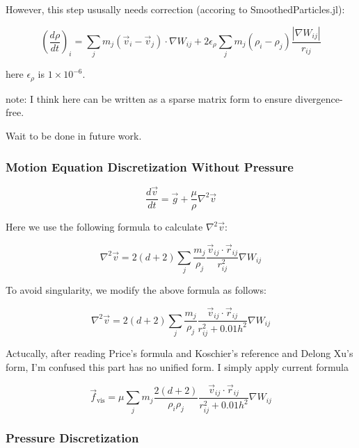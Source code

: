 \documentclass[10pt, oneside]{article}
\begin{document}
However, this step ususally needs correction (accoring to SmoothedParticles.jl):

\begin{equation}
    \left(\frac{d\rho}{dt}\right)_i = 
    \sum_j m_j (\vec{v}_i-\vec{v}_j)\cdot \nabla W_{ij}+
    2\epsilon_\rho\sum_j m_j (\rho_i-\rho_j)\frac{|\nabla W_{ij}|}{r_{ij}}
\end{equation}

here $\epsilon_\rho$ is $1\times 10^{-6}$.

note: I think here can be written as a sparse matrix form to ensure divergence-free.

Wait to be done in future work.

\subsubsection{Motion Equation Discretization Without Pressure}

\begin{equation}
    \frac{d\vec{v}}{dt} = \vec{g} + \frac{\mu}{\rho} \nabla^2 \vec{v}
\end{equation}

Here we use the following formula to calculate $\nabla^2 \vec{v}$:

\begin{equation}
    \nabla^2 \vec{v} = 2(d+2)\sum_j
    \frac{m_j}{\rho_j}\frac{\vec{v}_{ij}\cdot \vec{r}_{ij}}{r_{ij}^2}\nabla W_{ij}
\end{equation}

To avoid singularity, we modify the above formula as follows:

\begin{equation}
    \nabla^2 \vec{v} = 2(d+2)\sum_j
    \frac{m_j}{\rho_j}\frac{\vec{v}_{ij}\cdot \vec{r}_{ij}}{r_{ij}^2+0.01h^2}\nabla W_{ij}
\end{equation}

Actucally, after reading Price's formula and Koschier's reference and Delong Xu's 
form, I'm confused this part has no unified form. I simply apply current formula

\begin{equation}
    \vec{f}_{\text{vis}}=
    \mu \sum_{j} m_j \frac{2(d+2)}{\rho_i\rho_j}
    \frac{\vec{v}_{ij}\cdot \vec{r}_{ij}}{r_{ij}^2+0.01h^2}\nabla W_{ij}
\end{equation}

\subsubsection{Pressure Discretization}
\end{document}
